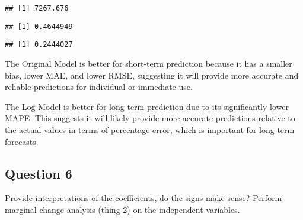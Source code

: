 \documentclass[
]{article}
\newenvironment{Shaded}{\begin{snugshade}}{\end{snugshade}}
\newcommand{\CommentTok}[1]{\textcolor[rgb]{0.56,0.35,0.01}{\textit{#1}}}
\newcommand{\ControlFlowTok}[1]{\textcolor[rgb]{0.13,0.29,0.53}{\textbf{#1}}}
\newcommand{\FunctionTok}[1]{\textcolor[rgb]{0.13,0.29,0.53}{\textbf{#1}}}
\newcommand{\NormalTok}[1]{#1}
\newcommand{\OtherTok}[1]{\textcolor[rgb]{0.56,0.35,0.01}{#1}}
\newcommand{\SpecialCharTok}[1]{\textcolor[rgb]{0.81,0.36,0.00}{\textbf{#1}}}
\begin{document}
\begin{verbatim}
## [1] 7267.676
\end{verbatim}

\begin{Shaded}
\end{Shaded}

\begin{verbatim}
## [1] 0.4644949
\end{verbatim}

\begin{Shaded}
\end{Shaded}

\begin{verbatim}
## [1] 0.2444027
\end{verbatim}

The Original Model is better for short-term prediction because it has a
smaller bias, lower MAE, and lower RMSE, suggesting it will provide more
accurate and reliable predictions for individual or immediate use.

The Log Model is better for long-term prediction due to its
significantly lower MAPE. This suggests it will likely provide more
accurate predictions relative to the actual values in terms of
percentage error, which is important for long-term forecasts.

\subsection{Question 6}\label{question-6}

Provide interpretations of the coefficients, do the signs make sense?
Perform marginal change analysis (thing 2) on the independent variables.
\end{document}
